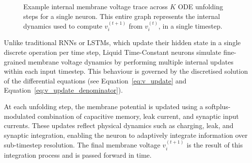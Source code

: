 \begin{figure}[H]
    \centering
    \caption{Example internal membrane voltage trace across $K$ ODE unfolding steps for a single neuron. This entire graph represents the internal dynamics used to compute $v_i^{(t+1)}$ from $v_i^{(t)}$, in a single timestep.}
    \label{fig:lif_voltage_evolution}
\end{figure}

Unlike traditional RNNs or LSTMs, which update their hidden state in a single discrete operation per time step, Liquid Time-Constant neurons simulate fine-grained membrane voltage dynamics by performing multiple internal updates within each input timestep. This behaviour is governed by the discretised solution of the differential equations (see Equation~\ref{eq:v_update} and Equation~\ref{eq:v_update_denominator}).

At each unfolding step, the membrane potential is updated using a softplus-modulated combination of capacitive memory, leak current, and synaptic input currents. These updates reflect physical dynamics such as charging, leak, and synaptic integration, enabling the neuron to adaptively integrate information over sub-timestep resolution. The final membrane voltage $v_i^{(t+1)}$ is the result of this integration process and is passed forward in time.

